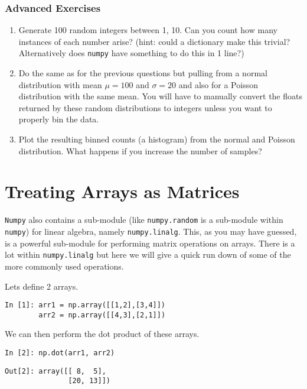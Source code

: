 \subsubsection{Advanced Exercises}
\begin{enumerate}
\item Generate 100 random integers between 1, 10. Can you count how many instances of each number arise? (hint: could a dictionary make this trivial? Alternatively does \texttt{numpy} have something to do this in 1 line?)
\item Do the same as for the previous questions but pulling from a normal distribution with mean $\mu=100$ and $\sigma=20$ and also for a Poisson distribution with the same mean. You will have to manually convert the floats returned by these random distributions to integers unless you want to properly bin the data.
\item Plot the resulting binned counts (a histogram) from the normal and Poisson distribution. What happens if you increase the number of samples?
\end{enumerate}

\section{Treating Arrays as Matrices}

\texttt{Numpy} also contains a sub-module (like \texttt{numpy.random} is a sub-module within \texttt{numpy}) for linear algebra, namely \texttt{numpy.linalg}. This, as you may have guessed, is a powerful sub-module for performing matrix operations on arrays. There is a lot within \texttt{numpy.linalg} but here we will give a quick run down of some of the more commonly used operations.

Lets define 2 arrays.

\begin{lstlisting}[style=PY]
In [1]: arr1 = np.array([[1,2],[3,4]])
        arr2 = np.array([[4,3],[2,1]])
\end{lstlisting}


We can then perform the dot product of these arrays.

\begin{lstlisting}[style=PY]
In [2]: np.dot(arr1, arr2)
\end{lstlisting}
\begin{lstlisting}[style=PY, backgroundcolor=\color{white}]
Out[2]: array([[ 8,  5],
               [20, 13]])
\end{lstlisting}

